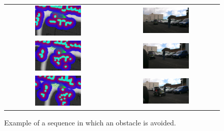 \begin{figure}[h!]
\begin{tabular}{cc}
\includegraphics[width=0.45\textwidth]{example9} &
\includegraphics[width=0.45\textwidth]{seq9}\label{fig:cp07_seq1}\\
\includegraphics[width=0.45\textwidth]{example10} &
\includegraphics[width=0.45\textwidth]{seq10}\label{fig:cp07_seq2}\\
\includegraphics[width=0.45\textwidth]{example11} &
\includegraphics[width=0.45\textwidth]{seq11}\label{fig:cp07_seq3}
\end{tabular}
\caption{Example of a sequence in which an obstacle is avoided.}\label{fig:cp07_sequence}
\end{figure}

